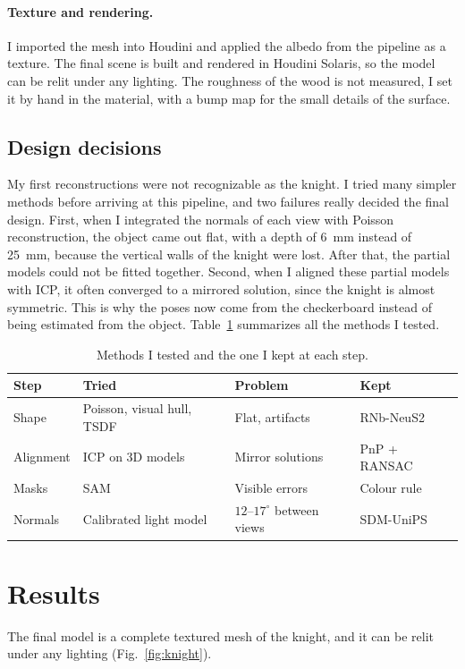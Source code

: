 \documentclass[10pt,twocolumn]{article}
\begin{document}
\paragraph{Texture and rendering.} I imported the mesh into Houdini and applied the albedo from the pipeline as a texture. The final scene is built and rendered in Houdini Solaris, so the model can be relit under any lighting. The roughness of the wood is not measured, I set it by hand in the material, with a bump map for the small details of the surface.

\subsection{Design decisions}
My first reconstructions were not recognizable as the knight. I tried many simpler methods before arriving at this pipeline, and two failures really decided the final design. First, when I integrated the normals of each view with Poisson reconstruction, the object came out flat, with a depth of 6~mm instead of 25~mm, because the vertical walls of the knight were lost. After that, the partial models could not be fitted together. Second, when I aligned these partial models with ICP, it often converged to a mirrored solution, since the knight is almost symmetric. This is why the poses now come from the checkerboard instead of being estimated from the object. Table~\ref{tab:decisions} summarizes all the methods I tested.
\begin{table}[!t]
\centering
\small
\begin{tabular}{@{}llll@{}}
\toprule
Step & Tried & Problem & Kept \\
\midrule
Shape & Poisson, visual hull, TSDF & Flat, artifacts & RNb-NeuS2 \\
Alignment & ICP on 3D models & Mirror solutions & PnP + RANSAC \\
Masks & SAM & Visible errors & Colour rule \\
Normals & Calibrated light model & $12$--$17^\circ$ between views & SDM-UniPS \\
\bottomrule
\end{tabular}
\caption{Methods I tested and the one I kept at each step.}
\label{tab:decisions}
\end{table}

\section{Results}
The final model is a complete textured mesh of the knight, and it can be relit under any lighting (Fig.~\ref{fig:knight}).
\end{document}
